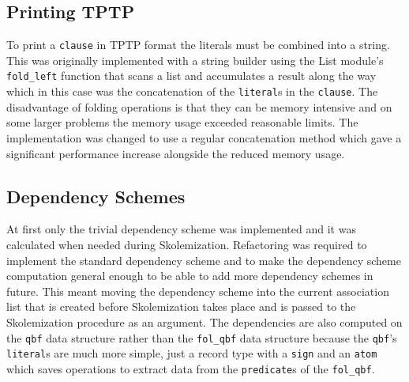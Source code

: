 \subsection{Printing TPTP}
To print a \texttt{clause} in TPTP format the literals must be combined into a string. This was originally implemented with a string builder using the List module's \texttt{fold\_left} function that scans a list and accumulates a result along the way which in this case was the concatenation of the \texttt{literal}s in the \texttt{clause}. The disadvantage of folding operations is that they can be memory intensive and on some larger problems the memory usage exceeded reasonable limits. The implementation was changed to use a regular concatenation method which gave a significant performance increase alongside the reduced memory usage.

\subsection{Dependency Schemes}
At first only the trivial dependency scheme was implemented and it was calculated when needed during Skolemization. Refactoring was required to implement the standard dependency scheme and to make the dependency scheme computation general enough to be able to add more dependency schemes in future. This meant moving the dependency scheme into the current association list that is created before Skolemization takes place and is passed to the Skolemization procedure as an argument. The dependencies are also computed on the \texttt{qbf} data structure rather than the \texttt{fol\_qbf} data structure because the \texttt{qbf}'s \texttt{literal}s are much more simple, just a record type with a \texttt{sign} and an \texttt{atom} which saves operations to extract data from the \texttt{predicate}s of the \texttt{fol\_qbf}.
